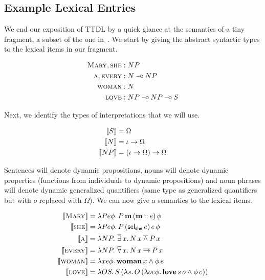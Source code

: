 \subsection{Example Lexical Entries}
\label{ssec:ttdl-lexicon}

We end our exposition of TTDL by a quick glance at the semantics of a tiny
fragment, a subset of the one in~\cite{de2006towards}. We start by giving
the abstract syntactic types to the lexical items in our fragment.

\begin{align*}
  \textsc{Mary}, \textsc{she} &: NP \\
  \textsc{a}, \textsc{every} &: N \mathbin{{-}\mkern-3.5mu{\circ}} NP \\
  \textsc{woman} &: N \\
  \textsc{love} &: NP \mathbin{{-}\mkern-3.5mu{\circ}} NP \mathbin{{-}\mkern-3.5mu{\circ}} S
\end{align*}

Next, we identify the types of interpretations that we will use.

\begin{align*}
  \llbracket S \rrbracket &= \Omega \\
  \llbracket N \rrbracket &= \iota \to \Omega \\
  \llbracket NP \rrbracket &= (\iota \to \Omega) \to \Omega
\end{align*}

Sentences will denote dynamic propositions, nouns will denote dynamic
properties (functions from individuals to dynamic propositions) and noun
phrases will denote dynamic generalized quantifiers (same type as
generalized quantifiers but with $o$ replaced with $\Omega$). We can now
give a semantics to the lexical items.

\begin{align*}
  \llbracket \textsc{Mary} \rrbracket &= \lambda P e \phi.\, P\,\textbf{m}\,(\textbf{m} \mathbin{::} e)\,\phi \\
  \llbracket \textsc{she} \rrbracket &= \lambda P e \phi.\, P\,(\mathsf{sel}_{\mathsf{she}}\,e)\,e\,\phi \\
  \llbracket \textsc{a} \rrbracket &= \lambda N P.\, \mathop{\overline{\exists}} x.\, N\,x \mathbin{\overline{\land}} P\,x \\
  \llbracket \textsc{every} \rrbracket &= \lambda N P.\, \mathop{\overline{\forall}} x.\, N\,x \mathbin{\overline{\to}} P\,x \\
  \llbracket \textsc{woman} \rrbracket &= \lambda x e \phi.\, \textbf{woman}\,x \land \phi\,e \\
  \llbracket \textsc{love} \rrbracket &= \lambda O S.\, S\,(\lambda s.\, O\,(\lambda o e \phi.\, \textbf{love}\,s\,o \land \phi\,e))
\end{align*}

